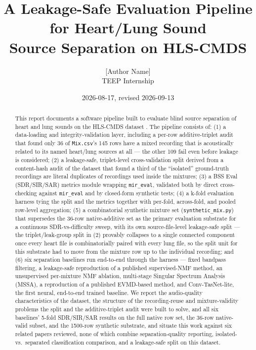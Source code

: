 \documentclass[11pt]{article}
\title{A Leakage-Safe Evaluation Pipeline for Heart/Lung Sound\\
Source Separation on HLS-CMDS}
\author{[Author Name] \\ TEEP Internship}
\date{2026-08-17, revised 2026-09-13}
\begin{document}
\maketitle

\begin{abstract}
This report documents a software pipeline built to evaluate blind source
separation of heart and lung sounds on the HLS-CMDS dataset
\cite{hlscmds}. The pipeline consists of: (1) a data-loading and
integrity-validation layer, including a per-row additive-triplet audit that
found only 36 of \texttt{Mix.csv}'s 145 rows have a mixed recording that is
acoustically related to its named heart/lung sources at all --- the other
109 fail even before leakage is considered; (2) a leakage-safe,
triplet-level cross-validation split derived from a content-hash audit of
the dataset that found a third of the ``isolated'' ground-truth recordings
are literal duplicates of recordings used inside the mixtures; (3) a BSS
Eval (SDR/SIR/SAR) metrics module wrapping \texttt{mir\_eval}, validated
both by direct cross-checking against \texttt{mir\_eval} and by closed-form
synthetic tests; (4) a k-fold evaluation harness tying the split and the
metrics together with per-fold, across-fold, and pooled row-level
aggregation; (5) a combinatorial synthetic mixture set
(\texttt{synthetic\_mix.py}) that supersedes the 36-row native-additive set
as the primary evaluation substrate for a continuous SDR-vs-difficulty
sweep, with its own source-file-level leakage-safe split --- the
triplet/leak-group split in (2) provably collapses to a single connected
component once every heart file is combinatorially paired with every lung
file, so the split unit for this substrate had to move from the mixture row
up to the individual recording; and (6) six separation baselines run
end-to-end through the harness --- fixed bandpass filtering, a leakage-safe
reproduction of a published supervised-NMF method, an unsupervised
per-mixture NMF ablation, multi-stage Singular Spectrum Analysis (MSSA), a
reproduction of a published EVMD-based method, and Conv-TasNet-lite, the
first neural, end-to-end trained baseline. We report the audio-quality
characteristics of the dataset, the structure of the recording-reuse and
mixture-validity problems the split and the additive-triplet audit were
built to solve, and all six baselines' 5-fold SDR/SIR/SAR results on the
full native row set, the 36-row native-valid subset, and the 1500-row
synthetic substrate, and situate this work against six related papers
reviewed, none of which combine separation-quality reporting, isolated-vs.\
separated classification comparison, and a leakage-safe split on this
dataset.


\end{abstract}
\end{document}
